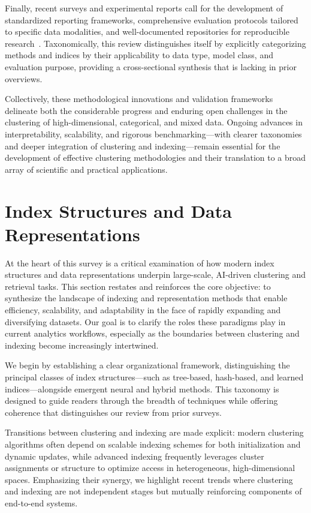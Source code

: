 \documentclass[sigconf]{acmart}
\begin{document}
Finally, recent surveys and experimental reports call for the development of standardized reporting frameworks, comprehensive evaluation protocols tailored to specific data modalities, and well-documented repositories for reproducible research~\cite{ref14,ref67,ref74,ref113,ref116}. Taxonomically, this review distinguishes itself by explicitly categorizing methods and indices by their applicability to data type, model class, and evaluation purpose, providing a cross-sectional synthesis that is lacking in prior overviews.

Collectively, these methodological innovations and validation frameworks delineate both the considerable progress and enduring open challenges in the clustering of high-dimensional, categorical, and mixed data. Ongoing advances in interpretability, scalability, and rigorous benchmarking---with clearer taxonomies and deeper integration of clustering and indexing---remain essential for the development of effective clustering methodologies and their translation to a broad array of scientific and practical applications.

\section{Index Structures and Data Representations}

At the heart of this survey is a critical examination of how modern index structures and data representations underpin large-scale, AI-driven clustering and retrieval tasks. This section restates and reinforces the core objective: to synthesize the landscape of indexing and representation methods that enable efficiency, scalability, and adaptability in the face of rapidly expanding and diversifying datasets. Our goal is to clarify the roles these paradigms play in current analytics workflows, especially as the boundaries between clustering and indexing become increasingly intertwined.

We begin by establishing a clear organizational framework, distinguishing the principal classes of index structures---such as tree-based, hash-based, and learned indices---alongside emergent neural and hybrid methods. This taxonomy is designed to guide readers through the breadth of techniques while offering coherence that distinguishes our review from prior surveys.

Transitions between clustering and indexing are made explicit: modern clustering algorithms often depend on scalable indexing schemes for both initialization and dynamic updates, while advanced indexing frequently leverages cluster assignments or structure to optimize access in heterogeneous, high-dimensional spaces. Emphasizing their synergy, we highlight recent trends where clustering and indexing are not independent stages but mutually reinforcing components of end-to-end systems.
\end{document}
